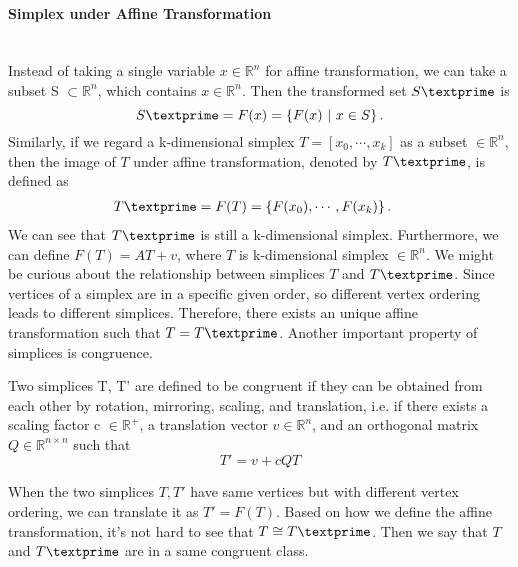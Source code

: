     \paragraph{Simplex under Affine Transformation}\mbox{}\\
    Instead of taking a single variable $x\in\mathbb{R}^n$ for affine transformation, we can take a subset S $\subset \mathbb{R}^n$, which contains $x\in\mathbb{R}^n$. Then the transformed set $S\textprime$ is
    \begin{equation*}
    S\textprime= {F}(x) = \left\{{F}(x) ~|~ x\in S \right\}.
    \end{equation*}
    Similarly, if we regard a k-dimensional simplex ${T} = [{x_0, \cdots, x_k}]$ as a subset $\in\mathbb{R}^n$, then the image of ${T}$ under affine transformation, denoted by $T\textprime$, is defined as
    \begin{equation*}
    \begin{split}
    {T}\textprime & = {F}({T}) = \left\{{F}(x_0), \cdots , {F}(x_k)\right\}.
    \end{split}
    \end{equation*}
    We can see that ${T}\textprime$ is still a k-dimensional simplex. Furthermore, we can define ${F}({T}) = {AT} + {v}$, where $T$ is k-dimensional simplex $\in\mathbb{R}^n$. We might be curious about the relationship between simplices ${T}$ and ${T}\textprime$. Since vertices of a simplex are in a specific given order, so different vertex ordering leads to different simplices. Therefore, there exists an unique affine transformation such that ${T} = {T}\textprime$. Another important property of simplices is congruence.

    \begin{definition*}
    Two simplices T, T' are defined to be congruent if they can be obtained from each other by rotation, mirroring, scaling, and translation, i.e. if there exists a scaling factor c $\in\mathbb{R}^{+}$, a translation vector $v\in\mathbb{R}^n$, and an orthogonal matrix $Q\in\mathbb{R}^{n\times n}$ such that
    \begin{equation*}
    T' = v + cQT
    \end{equation*}
    \end{definition*}
    \noindent
    When the two simplices $T, T'$ have same vertices but with different vertex ordering, we can translate it as $T' = F(T)$. Based on how we define the affine transformation, it's not hard to see that ${T} \cong {T}\textprime$. Then we say that ${T}$ and ${T}\textprime$ are in a same congruent class.